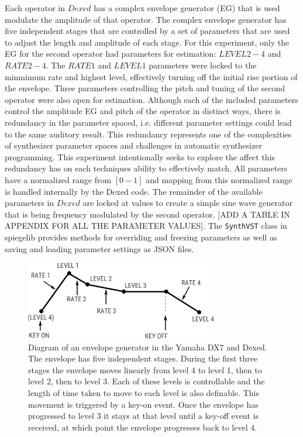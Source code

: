 Each operator in $Dexed$ has a complex envelope generator (EG) that is used modulate the amplitude of that operator. The complex envelope generator has five independent stages that are controlled by a set of parameters that are used to adjust the length and amplitude of each stage. For this experiment, only the EG for the second operator had parameters for estimation: $LEVEL 2-4$ and $RATE 2-4$. The $RATE 1$ and $LEVEL 1$ parameters were locked to the minmimum rate and highest level, effectively turning off the initial rise portion of the envelope. Three parameters controlling the pitch and tuning of the second operator were also open for estimation. Although each of the included parameters control the amplitude EG and pitch of the operator in distinct ways, there is redundancy in the parameter spaced, i.e. different parameter settings could lead to the same auditory result. This redundancy represents one of the complexities of synthesizer parameter spaces and challenges in automatic synthesizer programming. This experiment intentionally seeks to explore the affect this redundancy has on each techniques ability to effectively match. All parameters have a normalized range from $[0-1]$ and mapping from this normalized range is handled internally by the Dexed code. The remainder of the available parameters in $Dexed$ are locked at values to create a simple sine wave generator that is being frequency modulated by the second operator. [ADD A TABLE IN APPENDIX FOR ALL THE PARAMETER VALUES]. The \texttt{SynthVST} class in spiegelib provides methods for overriding and freezing parameters as well as saving and loading parameter settings as JSON files. 

\begin{figure}[ht]
    \centering
    \includegraphics[width=0.75\textwidth]{figures/spiegelib/Yamaha DX7 Envelope.png}
    \caption{Diagram of an envelope generator in the Yamaha DX7 and Dexed. The envelope has five independent stages. During the first three stages the envelope moves linearly from level 4 to level 1, then to level 2, then to level 3. Each of these levels is controllable and the length of time taken to move to each level is also definable. This movement is triggered by a key-on event. Once the envelope has progressed to level 3 it stays at that level until a key-off event is received, at which point the envelope progresses back to level 4.}
    \label{fig:dx7_envelope}
\end{figure}


